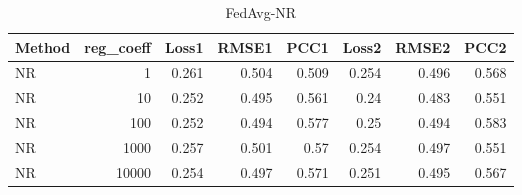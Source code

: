 \begin{table}
\caption{FedAvg-NR}
\begin{tabular}{lrrrrrrr}
\toprule
Method & reg_coeff & Loss1 & RMSE1 & PCC1 & Loss2 & RMSE2 & PCC2 \\
\midrule
NR & 1 & 0.261 & 0.504 & 0.509 & 0.254 & 0.496 & 0.568 \\
NR & 10 & 0.252 & 0.495 & 0.561 & 0.24 & 0.483 & 0.551 \\
NR & 100 & 0.252 & 0.494 & 0.577 & 0.25 & 0.494 & 0.583 \\
NR & 1000 & 0.257 & 0.501 & 0.57 & 0.254 & 0.497 & 0.551 \\
NR & 10000 & 0.254 & 0.497 & 0.571 & 0.251 & 0.495 & 0.567 \\
\bottomrule
\end{tabular}
\end{table}
